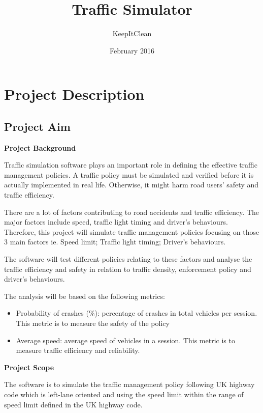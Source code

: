 \documentclass[11pt]{article}
\author{KeepItClean}
\title{Traffic Simulator}
\date{February 2016}
\begin{document}
\maketitle

\section{Project Description}
\subsection{Project Aim}
\begin{flushleft}
\textbf{Project Background}\par	
\end{flushleft}

Traffic simulation software plays an important role in defining the effective traffic management policies. A traffic policy must be simulated and verified before it is actually implemented in real life. Otherwise, it might harm road users’ safety and traffic efficiency.

There are a lot of factors contributing to road accidents and traffic efficiency. The major factors include speed, traffic light timing and driver’s behaviours. Therefore, this project will simulate traffic management policies focusing on those 3 main factors ie. Speed limit; Traffic light timing; Driver’s behaviours.

The software will test different policies relating to these factors and analyse the traffic efficiency and safety in relation to traffic density, enforcement policy and driver’s behaviours.

The analysis will be based on the following metrics:
\begin{itemize}
	\item Probability of crashes (\%): percentage of crashes in total vehicles per session. This metric is to measure the safety of the policy
	\item Average speed: average speed of vehicles in a session. This metric is to measure traffic efficiency and reliability.
\end{itemize}

\begin{flushleft}
\textbf{Project Scope} \par	
\end{flushleft}

The software is to simulate the traffic management policy following UK highway code which is left-lane oriented and using the speed limit within the range of speed limit defined in the UK highway code.
\end{document}
